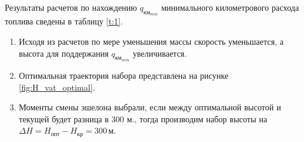 Результаты расчетов по нахождению $q_{{км}_{min}}$ минимального километрового
расхода топлива сведены в таблицу \ref{t:1}.

\begin{enumerate}
\item Исходя из расчетов по мере уменьшения массы скорость уменьшается, а
    высота для поддержания $q_{{км}_{min}}$ увеличивается.
\item Оптимальная траектория набора представлена на рисунке
    \ref{fig:H_vat_optimal}.
\item Моменты смены эшелона выбрали, если между оптимальной высотой и текущей
    будет разница в 300 м., тогда производим набор высоты на $\Delta H = H_{опт}
    - H_{кр} = 300 \, м$.  
\end{enumerate}
